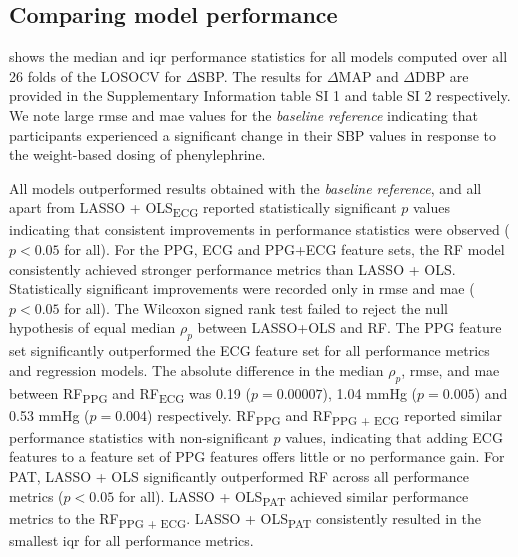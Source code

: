 \documentclass[fleqn,10pt]{wlscirep}
\begin{document}
\subsection{Comparing model performance}

 shows the median and \ac{iqr} performance statistics for all models computed over all 26 folds of the LOSOCV for $\Delta$SBP. The results for $\Delta$MAP and $\Delta$DBP are provided in the Supplementary Information table SI 1 and table SI 2 respectively. We note large \ac{rmse} and \ac{mae} values for the \textit{baseline reference} indicating that participants experienced a significant change in their SBP values in response to the weight-based dosing of phenylephrine. 

All models outperformed results obtained with the \textit{baseline reference}, and all apart from LASSO + OLS\textsubscript{ECG} reported statistically significant $p$ values indicating that consistent improvements in performance statistics were observed ($p < 0.05$ for all). For the PPG, ECG and PPG+ECG feature sets, the RF model consistently achieved stronger performance metrics than LASSO + OLS. Statistically significant improvements were recorded only in \ac{rmse} and \ac{mae} ($p < 0.05$ for all). The Wilcoxon signed rank test failed to reject the null hypothesis of equal median $\rho_p$ between LASSO+OLS and RF. The PPG feature set significantly outperformed the ECG feature set for all performance metrics and regression models. The absolute difference in the median $\rho_p$, \ac{rmse}, and \ac{mae} between RF\textsubscript{PPG} and RF\textsubscript{ECG} was 0.19 ($p = 0.00007$), 1.04 mmHg ($p = 0.005$) and 0.53 mmHg ($p = 0.004$) respectively. RF\textsubscript{PPG} and RF\textsubscript{PPG + ECG} reported similar performance statistics with non-significant $p$ values, indicating that adding ECG features to a feature set of PPG features offers little or no performance gain. For PAT, LASSO + OLS significantly outperformed RF across all performance metrics ($p < 0.05$ for all). LASSO + OLS\textsubscript{PAT} achieved similar performance metrics to the RF\textsubscript{PPG + ECG}. LASSO + OLS\textsubscript{PAT} consistently resulted in the smallest \ac{iqr} for all performance metrics.
\end{document}
